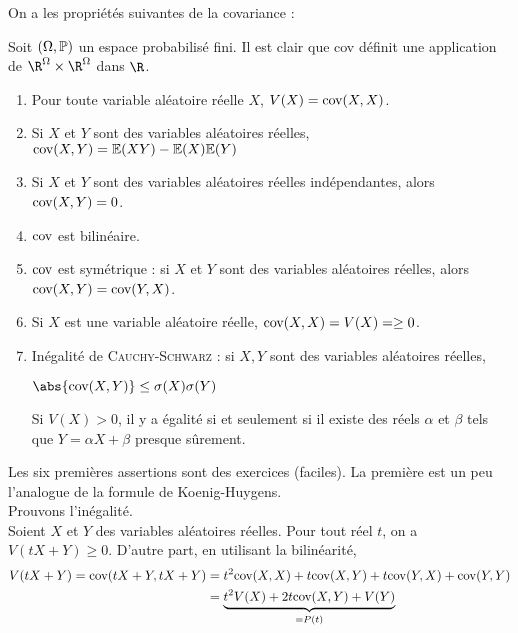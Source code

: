 \documentclass[12pt,a4paper]{report}
\begin{document}
On a les propriétés suivantes de la covariance : 
\begin{proposition}{}{}
Soit $(\Omega, \mathbb{P})$ un espace probabilisé fini. Il est clair que cov définit une application de $\R^\Omega \times \R^\Omega$ dans $\R$.
\begin{enumerate}
\item Pour toute variable aléatoire réelle $X$, $V(X) = \text{cov}(X,X)$.
\item Si $X$ et $Y$ sont des variables aléatoires réelles, $\text{cov}(X,Y) = \mathbb{E}(XY) - \mathbb{E}(X)\mathbb{E}(Y)$
\item Si $X$ et $Y$ sont des variables aléatoires réelles indépendantes, alors $\text{cov}(X,Y) = 0$.
\item $\text{cov}$ est bilinéaire.
\item $\text{cov}$ est symétrique : si $X$ et $Y$ sont des variables aléatoires réelles, alors $\text{cov}(X,Y) = \text{cov}(Y,X)$.
\item Si $X$ est une variable aléatoire réelle, $\text{cov}(X,X) = V(X) = \ge 0$.
\item Inégalité de \textsc{Cauchy-Schwarz} : si $X,Y$ sont des variables aléatoires réelles, 
\begin{center}
$\abs{\cov(X,Y)} \le \sigma(X) \sigma(Y)$
\end{center}
Si $V(X) > 0$, il y a égalité si et seulement si il existe des réels $\alpha$ et $\beta$ tels que $Y = \alpha X + \beta$ presque sûrement.
\end{enumerate}
\end{proposition}

\begin{demo}{}
Les six premières assertions sont des exercices (faciles). La première est un peu l'analogue de la formule de Koenig-Huygens. \\

Prouvons l'inégalité. \\
Soient $X$ et $Y$ des variables aléatoires réelles. Pour tout réel $t$, on a $V(tX+Y) \ge 0$. D'autre part, en utilisant la bilinéarité,
\begin{align*}
V(tX+Y) = \text{cov}(tX+Y,tX+Y) &= t^2 \text{cov}(X,X) + t \text{cov} (X,Y) + t \text{cov} (Y,X) + \text{cov}(Y,Y) \\
&= \underbrace{t^2 V(X) + 2t \text{cov}(X,Y) + V(Y)}_{=P(t)}
\end{align*}
\end{demo}
	
\end{document}
